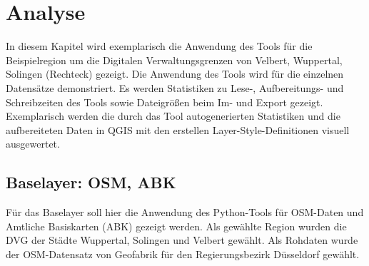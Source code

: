 
\chapter{Analyse}
	
	
	
	
	In diesem Kapitel wird exemplarisch die Anwendung des Tools für die Beispielregion um die Digitalen Verwaltungsgrenzen von Velbert, Wuppertal, Solingen (Rechteck) gezeigt. Die Anwendung des Tools wird für die einzelnen Datensätze demonstriert. Es werden Statistiken zu Lese-, Aufbereitungs- und Schreibzeiten des Tools sowie Dateigrößen beim Im- und Export gezeigt. Exemplarisch werden die durch das Tool autogenerierten Statistiken und die aufbereiteten Daten in QGIS mit den erstellen Layer-Style-Definitionen visuell ausgewertet.
	
	\section{Baselayer: OSM, ABK}
	\label{sec:analyse:baselayer}
		Für das Baselayer soll hier die Anwendung des Python-Tools für OSM-Daten und Amtliche Basiskarten (ABK) gezeigt werden. Als gewählte Region wurden die DVG der Städte Wuppertal, Solingen und Velbert gewählt. Als Rohdaten wurde der OSM-Datensatz von Geofabrik für den Regierungsbezirk Düsseldorf gewählt. 
		
